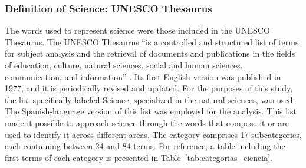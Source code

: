\documentclass[pdflatex,sn-mathphys-num, iicol]{sn-jnl}
\begin{document}
	
	\subsubsection{Definition of Science: UNESCO Thesaurus}\label{subsubsec:thesaurus}
	
	The words used to represent science were those included in the UNESCO Thesaurus. The UNESCO Thesaurus ``is a controlled and structured list of terms for subject analysis and the retrieval of documents and publications in the fields of education, culture, natural sciences, social and human sciences, communication, and information'' \cite{unesco_thesaurus_1977}. Its first English version was published in 1977, and it is periodically revised and updated. For the purposes of this study, the list specifically labeled Science, specialized in the natural sciences, was used. The Spanish-language version of this list was employed for the analysis. This list made it possible to approach science through the words that compose it or are used to identify it across different areas. The category comprises 17 subcategories, each containing between 24 and 84 terms. For reference, a table including the first terms of each category is presented in Table~\ref{tab:categorias_ciencia}.
	
\end{document}
